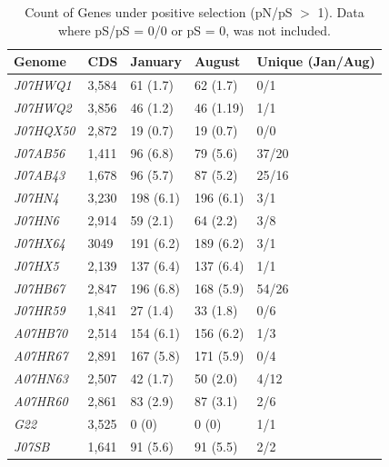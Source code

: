 \begin{table}[hbt]
  \caption{Count of Genes under positive selection (pN/pS $>$ 1). Data where pS/pS = 0/0 or pS = 0, was not included.}
  \begin{tabularx}{\textwidth}{L{2.2cm}R{2cm}R{3cm}R{3.2cm}R{2cm}}
  \hline
    \textbf{Genome} & \textbf{CDS} & \textbf{January} & \textbf{August} & \textbf{Unique (Jan/Aug)} \\
    \hline
     \textit{J07HWQ1} & 3,584 & 61 (1.7) & 62 (1.7) & 0/1 \\
     \textit{J07HWQ2} & 3,856 & 46 (1.2) & 46 (1.19) & 1/1 \\
     \textit{J07HQX50} & 2,872 & 19 (0.7) & 19 (0.7) & 0/0 \\
     \textit{J07AB56} & 1,411 & 96 (6.8) & 79 (5.6) & 37/20 \\
     \textit{J07AB43} & 1,678 & 96 (5.7) & 87 (5.2) & 25/16 \\
     \textit{J07HN4} & 3,230 & 198 (6.1) & 196 (6.1) & 3/1\\
     \textit{J07HN6} & 2,914 & 59 (2.1) & 64 (2.2) & 3/8 \\
     \textit{J07HX64} & 3049 & 191 (6.2) & 189 (6.2) & 3/1 \\
     \textit{J07HX5} & 2,139 & 137 (6.4) & 137 (6.4) & 1/1 \\
     \textit{J07HB67} & 2,847 & 196 (6.8) & 168 (5.9) & 54/26 \\
     \textit{J07HR59} & 1,841 & 27 (1.4) & 33 (1.8) & 0/6 \\
     \textit{A07HB70} & 2,514 & 154 (6.1) & 156 (6.2) & 1/3 \\
     \textit{A07HR67} & 2,891 & 167 (5.8) & 171 (5.9) & 0/4 \\
     \textit{A07HN63} & 2,507 & 42 (1.7) & 50 (2.0) & 4/12 \\
     \textit{A07HR60} & 2,861 & 83 (2.9) & 87 (3.1) & 2/6 \\
     \textit{G22} & 3,525 & 0 (0) & 0 (0) & 1/1 \\
     \textit{J07SB} & 1,641 & 91 (5.6) & 91 (5.5) & 2/2\\     
  \end{tabularx}
  \label{PSgenes}
\end{table}

